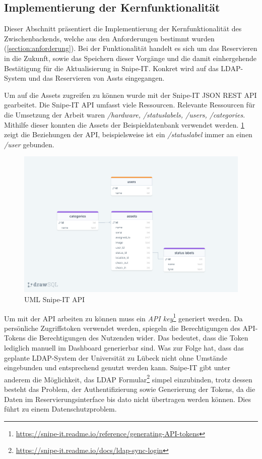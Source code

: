 \subsection{Implementierung der Kernfunktionalität}
Dieser Abschnitt präsentiert die Implementierung der Kernfunktionalität des Zwischenbackends, welche
aus den Anforderungen bestimmt wurden (\ref{section:anforderung}). Bei der Funktionalität handelt es
sich um das Reservieren in die Zukunft, sowie das Speichern dieser Vorgänge und die damit
einhergehende Bestätigung für die Aktualisierung in Snipe-IT. Konkret wird auf das LDAP-System und
das Reservieren von Assts eingegangen. 

Um auf die Assets zugreifen zu können wurde mit der Snipe-IT JSON REST API gearbeitet. Die Snipe-IT
API umfasst viele Ressourcen. Relevante Ressourcen für die Umsetzung der Arbeit waren \textit{/hardware,
/statuslabels, /users, /categories}. Mithilfe dieser konnten die Assets der Beispieldatenbank
verwendet werden. \ref{fig:snipe} zeigt die Beziehungen der API, beispielsweise ist ein
\textit{/statuslabel} immer an einen \textit{/user} gebunden. 

\begin{figure}[h]
  \centering
  \includegraphics[scale=0.2]{Bilder/drawSQL-export-2022-10-12_17 27.png}
  \caption[UML Snipe-IT API]{UML Snipe-IT API}
  \label{fig:snipe}
\end{figure}

Um mit der API arbeiten zu können muss ein \textit{API
  key}\footnote{\url{https://snipe-it.readme.io/reference/generating-API-tokens}}
  generiert werden. Da persönliche Zugriffstoken verwendet werden, spiegeln die
  Berechtigungen des API-Tokens die Berechtigungen des Nutzenden wider. Das
  bedeutet, dass die Token lediglich manuell im Dashboard generierbar sind.
  Was zur Folge hat, dass das geplante LDAP-System der Universität zu Lübeck
  nicht ohne Umstände eingebunden und entsprechend genutzt werden kann. Snipe-IT
  gibt unter anderem die Möglichkeit, das LDAP
  Formular\footnote{\url{https://snipe-it.readme.io/docs/ldap-sync-login}}
  simpel einzubinden, trotz dessen besteht das Problem, der Authentifizierung
  sowie Generierung der Tokens, da die Daten im Reservierungsinterface bis
  dato nicht übertragen werden können. Dies führt zu einem Datenschutzproblem.

